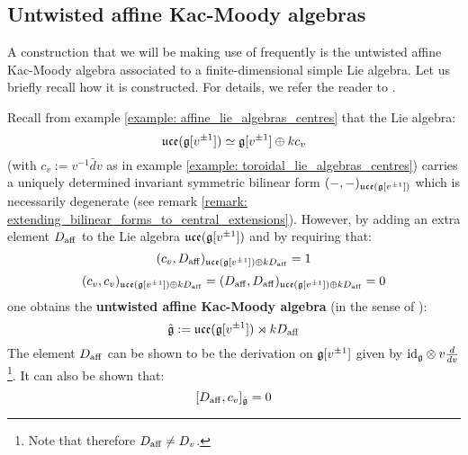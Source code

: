     \subsection{Untwisted affine Kac-Moody algebras} \label{subsection: a_fixed_untwisted_affine_kac_moody_algebra}
        A construction that we will be making use of frequently is the untwisted affine Kac-Moody algebra associated to a finite-dimensional simple Lie algebra. Let us briefly recall how it is constructed. For details, we refer the reader to \cite[Chapters 6 and 7]{kac_infinite_dimensional_lie_algebras}.

        Recall from example \ref{example: affine_lie_algebras_centres} that the Lie algebra:
            $$\mathfrak{uce}(\mathfrak{g}[v^{\pm 1}]) \simeq \mathfrak{g}[v^{\pm 1}] \oplus k c_v$$
        (with $c_v := v^{-1} \bar{d}v$ as in example \ref{example: toroidal_lie_algebras_centres}) carries a uniquely determined invariant symmetric bilinear form $(-, -)_{\mathfrak{uce}(\mathfrak{g}[v^{\pm 1}])}$ which is necessarily degenerate (see remark \ref{remark: extending_bilinear_forms_to_central_extensions}). However, by adding an extra element $D_{\mathrm{aff}}$ to the Lie algebra $\mathfrak{uce}(\mathfrak{g}[v^{\pm 1}])$ and by requiring that:
            $$(c_v, D_{\mathrm{aff}})_{\mathfrak{uce}(\mathfrak{g}[v^{\pm 1}]) \oplus k D_{\mathrm{aff}}} = 1$$
            $$(c_v, c_v)_{\mathfrak{uce}(\mathfrak{g}[v^{\pm 1}]) \oplus k D_{\mathrm{aff}}} = (D_{\mathrm{aff}}, D_{\mathrm{aff}})_{\mathfrak{uce}(\mathfrak{g}[v^{\pm 1}]) \oplus k D_{\mathrm{aff}}} = 0$$
        one obtains the \textbf{untwisted affine Kac-Moody algebra} (in the sense of \cite[Chapter 7]{kac_infinite_dimensional_lie_algebras}):
            $$\hat{\mathfrak{g}} := \mathfrak{uce}(\mathfrak{g}[v^{\pm 1}]) \rtimes k D_{\mathrm{aff}}$$
        The element $D_{\mathrm{aff}}$ can be shown to be the derivation on $\mathfrak{g}[v^{\pm 1}]$ given by $\id_{\g} \tensor v \frac{d}{dv}$\footnote{Note that therefore $D_{\mathrm{aff}} \not = D_v$.}. It can also be shown that:
            $$[D_{\mathrm{aff}}, c_v]_{\hat{\mathfrak{g}}} = 0$$

